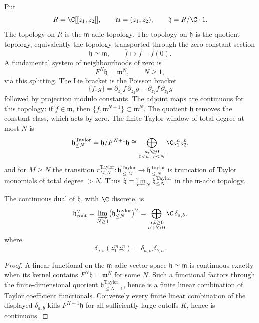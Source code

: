 \begin{defn}
\label{def:app-matlis-topology}
  Put
  \[
    R=\C[[z_1,z_2]],\qquad \mathfrak m=(z_1,z_2),\qquad
    \mathfrak h=R/\C\cdot1 .
  \]
  The topology on \(R\) is the \(\mathfrak m\)-adic topology.  The
  topology on \(\mathfrak h\) is the quotient topology, equivalently
  the topology transported through the zero-constant section
  \[
    \mathfrak h\simeq \mathfrak m,\qquad
    \overline f\longmapsto f-f(0).
  \]
  A fundamental system of neighbourhoods of zero is
  \[
    F^N\mathfrak h=\mathfrak m^N,\qquad N\geq1,
  \]
  via this splitting.  The Lie bracket is the Poisson bracket
  \[
    \{f,g\}=\partial_{z_1}f\,\partial_{z_2}g
      -\partial_{z_2}f\,\partial_{z_1}g
  \]
  followed by projection modulo constants.  The adjoint maps are continuous
  for this topology: if \(f\in\mathfrak m\), then
  \(\{f,\mathfrak m^{N+1}\}\subset \mathfrak m^N\).  The quotient
  \(\mathfrak h\) removes the constant class, which acts by zero.
  The finite Taylor window of total degree at most \(N\) is
  \[
    \mathfrak h^{\mathrm{Taylor}}_{\leq N}
      =\mathfrak h/F^{N+1}\mathfrak h
      \cong
      \bigoplus_{\substack{a,b\geq0\\0<a+b\leq N}}
        \C z_1^az_2^b ,
  \]
  and for \(M\geq N\) the transition
  \(r^{\mathrm{Taylor}}_{M,N}\colon
  \mathfrak h^{\mathrm{Taylor}}_{\leq M}\to
  \mathfrak h^{\mathrm{Taylor}}_{\leq N}\) is
  truncation of Taylor monomials of total degree \(>N\).  Thus
  \(\mathfrak h=\varprojlim_N\mathfrak h^{\mathrm{Taylor}}_{\leq N}\) in the
  \(\mathfrak m\)-adic topology.
\end{defn}

\begin{lem}
\label{lem:app-matlis-continuous-dual}
  The continuous dual of \(\mathfrak h\), with \(\C\) discrete, is
  \[
    \mathfrak h^\vee_{\mathrm{cont}}
      =\varinjlim_{N\geq1}
        \bigl(\mathfrak h^{\mathrm{Taylor}}_{\leq N}\bigr)^\vee
      =\bigoplus_{\substack{a,b\geq0\\a+b>0}}\C\,\delta_{a,b},
  \]
  where
  \[
    \delta_{a,b}(z_1^m z_2^n)=\delta_{a,m}\delta_{b,n}.
  \]
\end{lem}

\begin{proof}
  A linear functional on the \(\mathfrak m\)-adic vector space
  \(\mathfrak h\simeq\mathfrak m\) is continuous exactly when its
  kernel contains \(F^N\mathfrak h=\mathfrak m^N\) for some \(N\).
  Such a functional factors through the finite-dimensional quotient
  \(\mathfrak h^{\mathrm{Taylor}}_{\leq N-1}\), hence is a finite linear combination
  of Taylor coefficient functionals.  Conversely every finite linear
  combination of the displayed \(\delta_{a,b}\) kills \(F^{K+1}\mathfrak h\)
  for all sufficiently large cutoffs \(K\), hence is continuous.
\end{proof}


